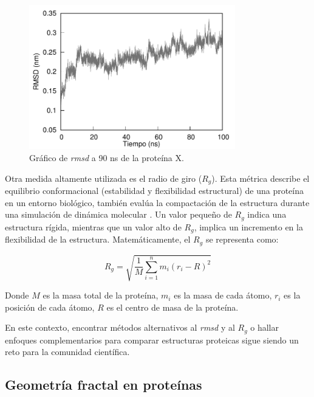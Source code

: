 	\begin{figure}[h!]
		\centering
		\includegraphics[width=0.8\textwidth]{graphs/rmsd.pdf}
	\caption{Gr\'{a}fico de \textit{rmsd} a 90 ns de la prote\'{i}na X.}
	\label{rmsd-graf}
	\end{figure}


Otra medida altamente utilizada es el radio de giro ($R_g$). Esta métrica describe el equilibrio conformacional (estabilidad y flexibilidad estructural) de una proteína en un entorno biológico, también evalúa la compactación de la estructura durante una simulación de dinámica molecular \cite{Saudagar2023}. Un valor pequeño de $R_g$ indica una estructura rígida, mientras que un valor alto de $R_g$, implica un incremento en la flexibilidad de la estructura. Matemáticamente, el $R_g$ se representa como:


\begin{equation}
	R_g = \sqrt{\frac{1}{M} \sum_{i=1}^{n} m_i \left( r_i - R \right)^2 }
	\label{eq:rg}
\end{equation}

Donde $M$ es la masa total de la proteína, $m_i$ es la masa de cada átomo, $r_i$ es la posición de cada átomo, $R$ es el centro de masa de la proteína.

En este contexto, encontrar m\'{e}todos alternativos al \textit{rmsd} y al $R_g$ o hallar enfoques complementarios para comparar estructuras proteicas sigue siendo un reto para la comunidad cient\'{i}ﬁca.

\subsection{Geometr\'{i}a fractal en prote\'{i}nas}
\label{subsec:gfp}

